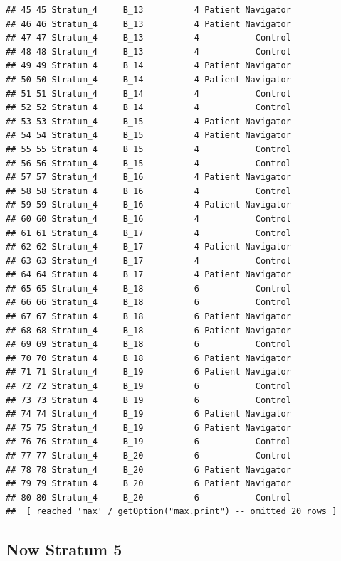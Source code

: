 \documentclass[
]{book}
\begin{document}
\begin{verbatim}
## 45 45 Stratum_4     B_13          4 Patient Navigator
## 46 46 Stratum_4     B_13          4 Patient Navigator
## 47 47 Stratum_4     B_13          4           Control
## 48 48 Stratum_4     B_13          4           Control
## 49 49 Stratum_4     B_14          4 Patient Navigator
## 50 50 Stratum_4     B_14          4 Patient Navigator
## 51 51 Stratum_4     B_14          4           Control
## 52 52 Stratum_4     B_14          4           Control
## 53 53 Stratum_4     B_15          4 Patient Navigator
## 54 54 Stratum_4     B_15          4 Patient Navigator
## 55 55 Stratum_4     B_15          4           Control
## 56 56 Stratum_4     B_15          4           Control
## 57 57 Stratum_4     B_16          4 Patient Navigator
## 58 58 Stratum_4     B_16          4           Control
## 59 59 Stratum_4     B_16          4 Patient Navigator
## 60 60 Stratum_4     B_16          4           Control
## 61 61 Stratum_4     B_17          4           Control
## 62 62 Stratum_4     B_17          4 Patient Navigator
## 63 63 Stratum_4     B_17          4           Control
## 64 64 Stratum_4     B_17          4 Patient Navigator
## 65 65 Stratum_4     B_18          6           Control
## 66 66 Stratum_4     B_18          6           Control
## 67 67 Stratum_4     B_18          6 Patient Navigator
## 68 68 Stratum_4     B_18          6 Patient Navigator
## 69 69 Stratum_4     B_18          6           Control
## 70 70 Stratum_4     B_18          6 Patient Navigator
## 71 71 Stratum_4     B_19          6 Patient Navigator
## 72 72 Stratum_4     B_19          6           Control
## 73 73 Stratum_4     B_19          6           Control
## 74 74 Stratum_4     B_19          6 Patient Navigator
## 75 75 Stratum_4     B_19          6 Patient Navigator
## 76 76 Stratum_4     B_19          6           Control
## 77 77 Stratum_4     B_20          6           Control
## 78 78 Stratum_4     B_20          6 Patient Navigator
## 79 79 Stratum_4     B_20          6 Patient Navigator
## 80 80 Stratum_4     B_20          6           Control
##  [ reached 'max' / getOption("max.print") -- omitted 20 rows ]
\end{verbatim}

\hypertarget{now-stratum-5}{%
\subsection{Now Stratum 5}\label{now-stratum-5}}
\end{document}
